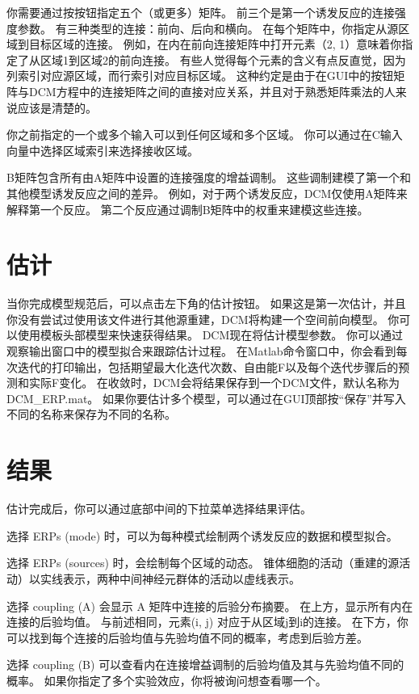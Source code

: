 你需要通过按按钮指定五个（或更多）矩阵。
前三个是第一个诱发反应的连接强度参数。
有三种类型的连接：前向、后向和横向。
在每个矩阵中，你指定从源区域到目标区域的连接。
例如，在内在前向连接矩阵中打开元素（2, 1）意味着你指定了从区域1到区域2的前向连接。
有些人觉得每个元素的含义有点反直觉，因为列索引对应源区域，而行索引对应目标区域。
这种约定是由于在GUI中的按钮矩阵与DCM方程中的连接矩阵之间的直接对应关系，并且对于熟悉矩阵乘法的人来说应该是清楚的。

你之前指定的一个或多个输入可以到任何区域和多个区域。
你可以通过在C输入向量中选择区域索引来选择接收区域。

B矩阵包含所有由A矩阵中设置的连接强度的增益调制。
这些调制建模了第一个和其他模型诱发反应之间的差异。
例如，对于两个诱发反应，DCM仅使用A矩阵来解释第一个反应。
第二个反应通过调制B矩阵中的权重来建模这些连接。


\section{估计}

当你完成模型规范后，可以点击左下角的估计按钮。
如果这是第一次估计，并且你没有尝试过使用该文件进行其他源重建，DCM将构建一个空间前向模型。
你可以使用模板头部模型来快速获得结果。
DCM现在将估计模型参数。
你可以通过观察输出窗口中的模型拟合来跟踪估计过程。
在Matlab命令窗口中，你会看到每次迭代的打印输出，包括期望最大化迭代次数、自由能F以及每个迭代步骤后的预测和实际F变化。
在收敛时，DCM会将结果保存到一个DCM文件，默认名称为DCM\_ERP.mat。
如果你要估计多个模型，可以通过在GUI顶部按“保存”并写入不同的名称来保存为不同的名称。


\section{结果}

估计完成后，你可以通过底部中间的下拉菜单选择结果评估。

选择 ERPs (mode) 时，可以为每种模式绘制两个诱发反应的数据和模型拟合。

选择 ERPs (sources) 时，会绘制每个区域的动态。
锥体细胞的活动（重建的源活动）以实线表示，两种中间神经元群体的活动以虚线表示。

选择 coupling (A) 会显示 A 矩阵中连接的后验分布摘要。
在上方，显示所有内在连接的后验均值。
与前述相同，元素(i, j) 对应于从区域j到i的连接。
在下方，你可以找到每个连接的后验均值与先验均值不同的概率，考虑到后验方差。

选择 coupling (B) 可以查看内在连接增益调制的后验均值及其与先验均值不同的概率。
如果你指定了多个实验效应，你将被询问想查看哪一个。

